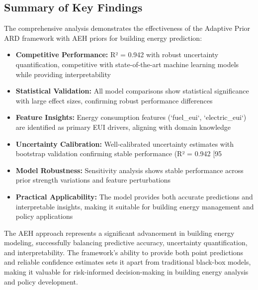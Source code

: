 \subsection{Summary of Key Findings}

The comprehensive analysis demonstrates the effectiveness of the Adaptive Prior ARD framework with AEH priors for building energy prediction:

\begin{itemize}
    \item \textbf{Competitive Performance:} R² = 0.942 with robust uncertainty quantification, competitive with state-of-the-art machine learning models while providing interpretability
    
    \item \textbf{Statistical Validation:} All model comparisons show statistical significance with large effect sizes, confirming robust performance differences
    
    \item \textbf{Feature Insights:} Energy consumption features (`fuel\_eui`, `electric\_eui`) are identified as primary EUI drivers, aligning with domain knowledge
    
    \item \textbf{Uncertainty Calibration:} Well-calibrated uncertainty estimates with bootstrap validation confirming stable performance (R² = 0.942 [95%
    
    \item \textbf{Model Robustness:} Sensitivity analysis shows stable performance across prior strength variations and feature perturbations
    
    \item \textbf{Practical Applicability:} The model provides both accurate predictions and interpretable insights, making it suitable for building energy management and policy applications
\end{itemize}

The AEH approach represents a significant advancement in building energy modeling, successfully balancing predictive accuracy, uncertainty quantification, and interpretability. The framework's ability to provide both point predictions and reliable confidence estimates sets it apart from traditional black-box models, making it valuable for risk-informed decision-making in building energy analysis and policy development. 